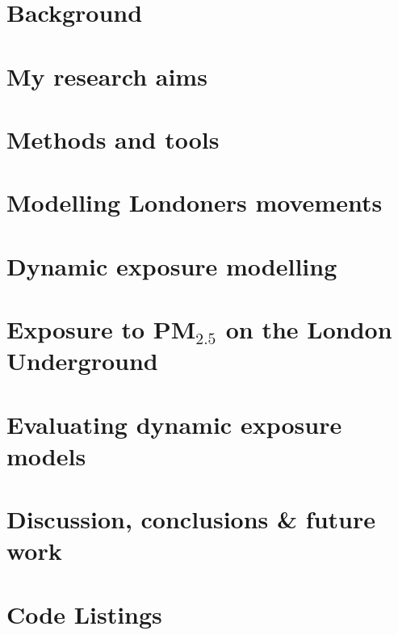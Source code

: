 \documentclass[12pt]{report}
\begin{document}
\chapter{Background}

\label{chap:background}

\label{chap:dynamic_exposure}

\chapter{My research aims}


\chapter{Methods and tools}


\chapter{Modelling Londoners movements}
\label{chap:the_ltdsx}


\chapter{Dynamic exposure modelling}
\label{chap:the_lhem}


\chapter{Exposure to \texorpdfstring{PM$_{2.5}$}{} on the London Underground}
\label{chap:monitoring_on_underground}


\chapter{Evaluating dynamic exposure models}
\label{chap:evaluating_dynamic_exposure_models}


\chapter{Discussion, conclusions \& future work}





\printglossary

\appendix

\chapter{Code Listings}

\end{document}
